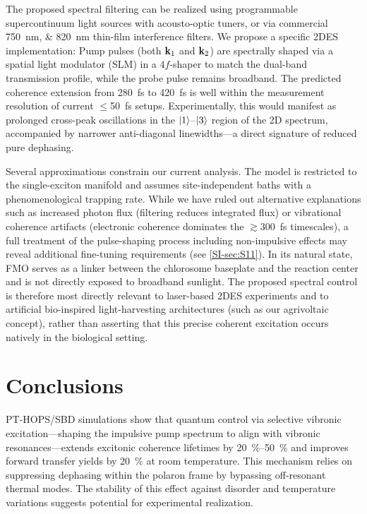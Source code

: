 \documentclass[journal=jpcl,manuscript=letter]{achemso}
\begin{document}
The proposed spectral filtering can be realized using programmable supercontinuum light sources with acousto-optic tuners,\cite{Gunthardt2023} or via commercial \SIlist{750;820}{\nano\meter} thin-film interference filters. We propose a specific 2DES implementation:\cite{Sebastian2024} Pump pulses (both $\vb{k}_1$ and $\vb{k}_2$) are spectrally shaped via a spatial light modulator (SLM) in a $4f$-shaper to match the dual-band transmission profile, while the probe pulse remains broadband.
The predicted coherence extension from \SI{280}{\femto\second} to \SI{420}{\femto\second} is well within the measurement resolution of current $\leq$\SI{50}{\femto\second} setups.\cite{Engel2007} Experimentally, this would manifest as prolonged cross-peak oscillations in the $\ket{1}$--$\ket{3}$ region of the 2D spectrum, accompanied by narrower anti-diagonal linewidths—a direct signature of reduced pure dephasing. 

Several approximations constrain our current analysis. The model is restricted to the single-exciton manifold and assumes site-independent baths with a phenomenological trapping rate. While we have ruled out alternative explanations such as increased photon flux (filtering reduces integrated flux) or vibrational coherence artifacts (electronic coherence dominates the $\gtrsim$\SI{300}{\femto\second} timescales), a full treatment of the pulse-shaping process including non-impulsive effects may reveal additional fine-tuning requirements (see \cref{SI-sec:S11}). In its natural state, FMO serves as a linker between the chlorosome baseplate and the reaction center and is not directly exposed to broadband sunlight.\cite{Blankenship2011} The proposed spectral control is therefore most directly relevant to laser-based 2DES experiments and to artificial bio-inspired light-harvesting architectures (such as our agrivoltaic concept), rather than asserting that this precise coherent excitation occurs natively in the biological setting.

\section*{Conclusions}

PT-HOPS/SBD simulations show that quantum control via selective vibronic excitation---shaping the impulsive pump spectrum to align with vibronic resonances---extends excitonic coherence lifetimes by \SIrange{20}{50}{\percent} and improves forward transfer yields by \SI{20}{\percent} at room temperature. This mechanism relies on suppressing dephasing within the polaron frame by bypassing off-resonant thermal modes. The stability of this effect against disorder and temperature variations suggests potential for experimental realization.
\end{document}
